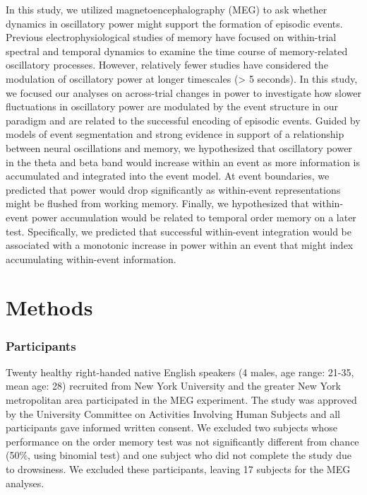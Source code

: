 In this study, we utilized magnetoencephalography (MEG) to ask whether
dynamics in oscillatory power might support the formation of episodic
events. Previous electrophysiological studies of memory have focused on
within-trial spectral and temporal dynamics to examine the time course
of memory-related oscillatory processes. However, relatively fewer
studies have considered the modulation of oscillatory power at longer
timescales (\textgreater{} 5 seconds). In this study, we focused our
analyses on across-trial changes in power to investigate how slower
fluctuations in oscillatory power are modulated by the event structure
in our paradigm and are related to the successful encoding of episodic
events. Guided by models of event segmentation and strong evidence in
support of a relationship between neural oscillations and memory, we
hypothesized that oscillatory power in the theta and beta band would
increase within an event as more information is accumulated and
integrated into the event model. At event boundaries, we predicted that
power would drop significantly as within-event representations might be
flushed from working memory. Finally, we hypothesized that within-event
power accumulation would be related to temporal order memory on a later
test. Specifically, we predicted that successful within-event
integration would be associated with a monotonic increase in power
within an event that might index accumulating within-event information.

\section{Methods}\label{methods}

\subsubsection{Participants}\label{participants}

Twenty healthy right-handed native English speakers (4 males, age range:
21-35, mean age: 28) recruited from New York University and the greater
New York metropolitan area participated in the MEG experiment. The study
was approved by the University Committee on Activities Involving Human
Subjects and all participants gave informed written consent. We excluded
two subjects whose performance on the order memory test was not
significantly different from chance (50\%, using binomial test) and one
subject who did not complete the study due to drowsiness. We excluded
these participants, leaving 17 subjects for the MEG analyses.

